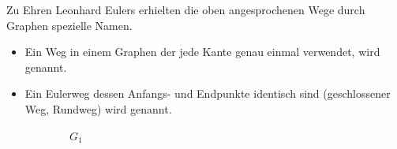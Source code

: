 \begin{mydefinition}\label{mydefinition:eulerkreis}
Zu Ehren Leonhard Eulers erhielten die oben angesprochenen Wege durch Graphen spezielle Namen.
\begin{itemize}
	\item Ein Weg in einem Graphen der jede Kante genau einmal verwendet, wird  genannt.
	\item Ein Eulerweg dessen Anfangs- und Endpunkte identisch sind (geschlossener Weg, Rundweg) wird  genannt.
\end{itemize}
\end{mydefinition}

\clearpage
\begin{myexercise}\label{myexercise:04}
	\begin{figure}[H]
		\centering
		\begin{subfigure}[b]{0.4\textwidth}
			\centering
			\caption*{$G_1$}
		\end{subfigure}
		\hfill
		\begin{subfigure}[b]{0.4\textwidth}
			\centering
\end{subfigure}
\end{figure}
\end{myexercise}
